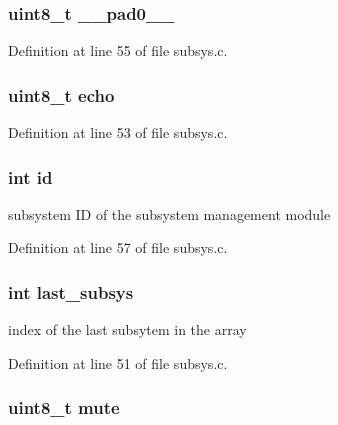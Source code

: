 \subsubsection[{\+\_\+\+\_\+pad0\+\_\+\+\_\+}]{\setlength{\rightskip}{0pt plus 5cm}uint8\+\_\+t \+\_\+\+\_\+pad0\+\_\+\+\_\+}\label{structsystem__t_a8b4eebe79ded0459acec2f4950102ba3}


Definition at line 55 of file subsys.\+c.

\hypertarget{structsystem__t_aab09b5cefcdbe22abc17b28373b9ea83}{}
\subsubsection[{echo}]{\setlength{\rightskip}{0pt plus 5cm}uint8\+\_\+t echo}\label{structsystem__t_aab09b5cefcdbe22abc17b28373b9ea83}


Definition at line 53 of file subsys.\+c.

\hypertarget{structsystem__t_a7441ef0865bcb3db9b8064dd7375c1ea}{}
\subsubsection[{id}]{\setlength{\rightskip}{0pt plus 5cm}int id}\label{structsystem__t_a7441ef0865bcb3db9b8064dd7375c1ea}
subsystem I\+D of the subsystem management module 

Definition at line 57 of file subsys.\+c.

\hypertarget{structsystem__t_ad47bc772fbe53a69905c02f6fc6cdba7}{}
\subsubsection[{last\+\_\+subsys}]{\setlength{\rightskip}{0pt plus 5cm}int last\+\_\+subsys}\label{structsystem__t_ad47bc772fbe53a69905c02f6fc6cdba7}
index of the last subsytem in the array 

Definition at line 51 of file subsys.\+c.

\hypertarget{structsystem__t_ad9aef3fe07cb77df6845f5830762396d}{}
\subsubsection[{mute}]{\setlength{\rightskip}{0pt plus 5cm}uint8\+\_\+t mute}\label{structsystem__t_ad9aef3fe07cb77df6845f5830762396d}


